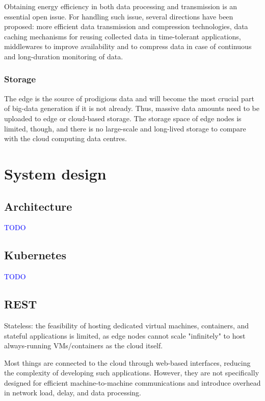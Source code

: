 \documentclass{ieeeaccess}
\begin{document}
Obtaining energy efficiency in both data processing and transmission is an essential open issue. For handling such issue, several directions have been proposed: more efficient data transmission and compression technologies, data caching mechanisms for reusing collected data in time-tolerant applications, middlewares to improve availability and to compress data in case of continuous and long-duration monitoring of data.

\subsubsection{Storage}

The edge is the source of prodigious data and will become the most crucial part of big-data generation if it is not already. Thus, massive data amounts need to be uploaded to edge or cloud-based storage. The storage space of edge nodes is limited, though, and there is no large-scale and long-lived storage to compare with the cloud computing data centres.

\section{System design}
\label{sec:technicals}

\subsection{Architecture}

\textcolor{blue}{TODO}

\subsection{Kubernetes}

\textcolor{blue}{TODO}

\subsection{REST}

Stateless: the feasibility of hosting dedicated virtual machines, containers, and stateful applications is limited, as edge nodes cannot scale "infinitely" to host always-running VMs/containers as the cloud itself.

Most things are connected to the cloud through web-based interfaces, reducing the complexity of developing such applications. However, they are not specifically designed for efficient machine-to-machine communications and introduce overhead in network load, delay, and data processing.
\end{document}
